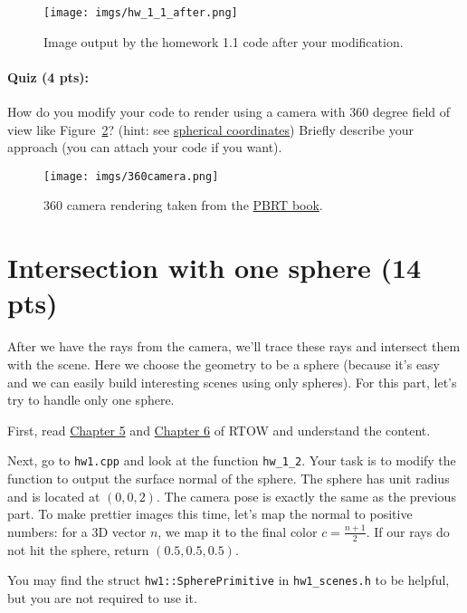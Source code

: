 \begin{figure}[ht]
    \centering
    \texttt{[image: imgs/hw\_1\_1\_after.png]}
    \caption{Image output by the homework 1.1 code after your modification.}
    \label{fig:hw_1_1_after}
\end{figure}

\paragraph{Quiz (4 pts):} How do you modify your code to render using a camera with 360 degree field of view like Figure~\ref{fig:360_camera}? (hint: see \href{https://en.wikipedia.org/wiki/Spherical_coordinate_system}{spherical coordinates}) Briefly describe your approach (you can attach your code if you want).
\begin{figure}[ht]
    \centering
    \texttt{[image: imgs/360camera.png]}
    \caption{360 camera rendering taken from the \href{https://www.pbr-book.org/3ed-2018/Camera_Models/Environment_Camera}{PBRT book}.}
    \label{fig:360_camera}
\end{figure}

\section{Intersection with one sphere (14 pts)}
After we have the rays from the camera, we'll trace these rays and intersect them with the scene. Here we choose the geometry to be a sphere (because it's easy and we can easily build interesting scenes using only spheres). For this part, let's try to handle only one sphere.

First, read \href{https://raytracing.github.io/books/RayTracingInOneWeekend.html\#addingasphere}{Chapter 5} and \href{https://raytracing.github.io/books/RayTracingInOneWeekend.html\#surfacenormalsandmultipleobjects}{Chapter 6} of RTOW and understand the content.

Next, go to \lstinline{hw1.cpp} and look at the function \lstinline{hw_1_2}. Your task is to modify the function to output the surface normal of the sphere. The sphere has unit radius and is located at $(0, 0, 2)$. The camera pose is exactly the same as the previous part. To make prettier images this time, let's map the normal to positive numbers: for a 3D vector $n$, we map it to the final color $c = \frac{n + 1}{2}$. If our rays do not hit the sphere, return $(0.5, 0.5, 0.5)$.

You may find the struct \lstinline{hw1::SpherePrimitive} in \lstinline{hw1_scenes.h} to be helpful, but you are not required to use it.

